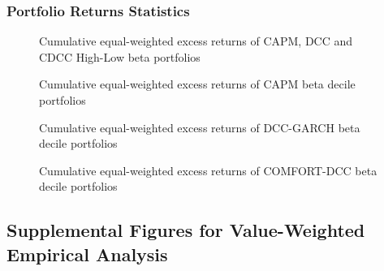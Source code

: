 \documentclass[11pt,a4paper]{article}
\begin{document}
\subsubsection{Portfolio Returns Statistics}

\begin{figure}[H]
	\vspace{-12mm}
	\hspace{-5mm}\vspace{-15mm}
	\caption{Cumulative equal-weighted excess returns of CAPM, DCC and CDCC High-Low beta portfolios}
	\label{figure:eq_cum_ret_high-low_appendix}
\end{figure}


\begin{figure}[H]
	\vspace{-12mm}
	\hspace{-5mm}\vspace{-15mm}
	\caption{Cumulative equal-weighted excess returns of CAPM beta decile portfolios}
	\label{figure:eq_cum_ret_deciles_CAPM}
\end{figure}

\begin{figure}[H]
	\vspace{-12mm}
	\hspace{-5mm}\vspace{-15mm}
	\caption{Cumulative equal-weighted excess returns of DCC-GARCH beta decile portfolios}
	\label{figure:eq_cum_ret_deciles_DCC}
\end{figure}

\begin{figure}[H]
	\vspace{-12mm}
	\hspace{-5mm}\vspace{-15mm}
	\caption{Cumulative equal-weighted excess returns of COMFORT-DCC beta decile portfolios}
	\label{figure:eq_cum_ret_deciles_COMFORT-DCC}
\end{figure}








\subsection{Supplemental Figures for Value-Weighted Empirical Analysis}
\end{document}
